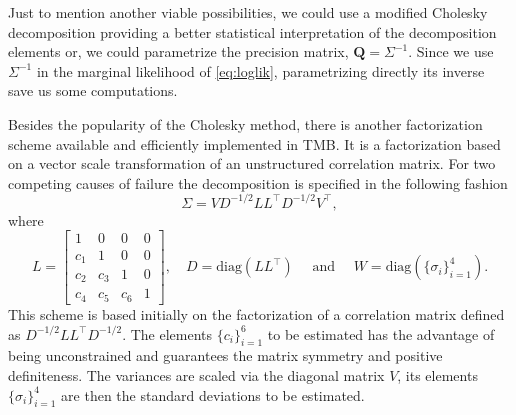 Just to mention another viable possibilities, we could use a modified
Cholesky decomposition \cite{modifiedcholesky} providing a better
statistical interpretation of the decomposition elements or, we could
parametrize the precision matrix, \(\bm{Q} = \Sigma^{-1}\). Since we use
\(\Sigma^{-1}\) in the marginal likelihood of \autoref{eq:loglik},
parametrizing directly its inverse save us some computations.

Besides the popularity of the Cholesky method, there is another
factorization scheme available and efficiently implemented in TMB. It is
a factorization based on a vector scale transformation of an
unstructured correlation matrix. For two competing causes of failure the
decomposition is specified in the following fashion
\[
  \Sigma = VD^{-1/2}LL^{\top}D^{-1/2}V^{\top},
\]
where
\[
 L = \begin{bmatrix}
      1&0&0&0\\
      c_{1}&1&0&0\\
      c_{2}&c_{3}&1&0\\
      c_{4}&c_{5}&c_{6}&1
     \end{bmatrix},\quad D = \text{diag}(LL^{\top})
 \quad\text{ and }
 \quad W = \text{diag}\left(\{\sigma_{i}\}_{i=1}^{4}\right).
\]
This scheme is based initially on the factorization of a correlation
matrix defined as \(D^{-1/2}LL^{\top}D^{-1/2}\). The elements
\(\{c_{i}\}_{i=1}^{6}\) to be estimated has the advantage of being
unconstrained and guarantees the matrix symmetry and positive
definiteness. The variances are scaled via the diagonal matrix \(V\),
its elements \(\{\sigma_{i}\}_{i=1}^{4}\) are then the standard
deviations to be estimated.

